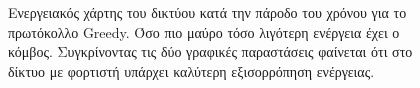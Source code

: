 \begin{figure}[H]
  \centering
  \caption{Ενεργειακός χάρτης του δικτύου κατά την πάροδο του χρόνου για το πρωτόκολλο Greedy. Όσο πιο μαύρο τόσο λιγότερη ενέργεια έχει ο κόμβος. Συγκρίνοντας τις
δύο
γραφικές παραστάσεις φαίνεται ότι στο δίκτυο με φορτιστή υπάρχει καλύτερη εξισορρόπηση ενέργειας.}
  \label{fig:5_1exp_4_1}
\end{figure}


